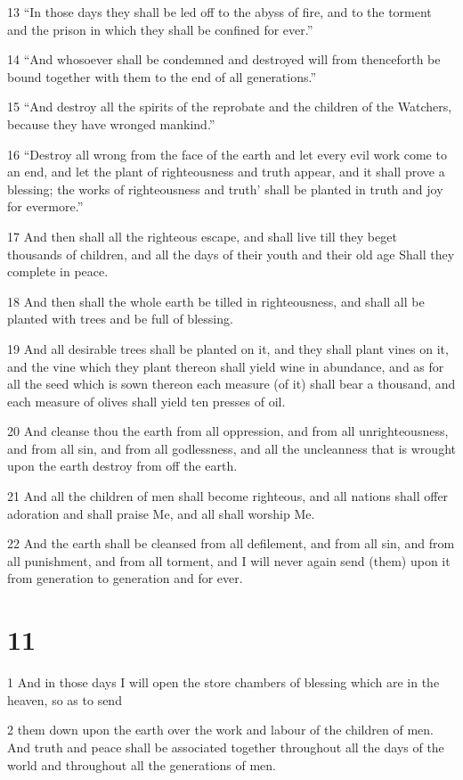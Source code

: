 \par 13 “In those days they shall be led off to the abyss of fire, and to the torment and the prison in which they shall be confined for ever.”
\par 14 “And whosoever shall be condemned and destroyed will from thenceforth be bound together with them to the end of all generations.”
\par 15 “And destroy all the spirits of the reprobate and the children of the Watchers, because they have wronged mankind.”
\par 16 “Destroy all wrong from the face of the earth and let every evil work come to an end, and let the plant of righteousness and truth appear, and it shall prove a blessing; the works of righteousness and truth' shall be planted in truth and joy for evermore.”
\par 17 And then shall all the righteous escape, and shall live till they beget thousands of children, and all the days of their youth and their old age Shall they complete in peace.
\par 18 And then shall the whole earth be tilled in righteousness, and shall all be planted with trees and be full of blessing.
\par 19 And all desirable trees shall be planted on it, and they shall plant vines on it, and the vine which they plant thereon shall yield wine in abundance, and as for all the seed which is sown thereon each measure (of it) shall bear a thousand, and each measure of olives shall yield ten presses of oil.
\par 20 And cleanse thou the earth from all oppression, and from all unrighteousness, and from all sin, and from all godlessness, and all the uncleanness that is wrought upon the earth destroy from off the earth.
\par 21 And all the children of men shall become righteous, and all nations shall offer adoration and shall praise Me, and all shall worship Me.
\par 22 And the earth shall be cleansed from all defilement, and from all sin, and from all punishment, and from all torment, and I will never again send (them) upon it from generation to generation and for ever.

\chapter{11}

\par 1 And in those days I will open the store chambers of blessing which are in the heaven, so as to send
\par 2 them down upon the earth over the work and labour of the children of men. And truth and peace shall be associated together throughout all the days of the world and throughout all the generations of men.

